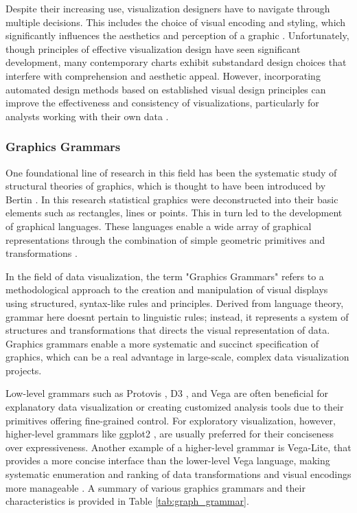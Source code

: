 Despite their increasing use, visualization designers have to navigate
through multiple decisions. This includes the choice of visual encoding
and styling, which significantly influences the aesthetics and
perception of a graphic
\cite{7}. Unfortunately,
though principles of effective visualization design have seen
significant development, many contemporary charts exhibit substandard
design choices that interfere with comprehension and aesthetic appeal.
However, incorporating automated design methods based on established
visual design principles can improve the effectiveness and consistency
of visualizations, particularly for analysts working with their own data
\cite{8}.

\subsubsection{{Graphics Grammars }}\label{graphics-grammars}

One foundational line of research in this field has been the systematic
study of structural theories of graphics, which is thought to have been
introduced by Bertin \cite{9}. In this research statistical graphics were deconstructed into their basic elements such as rectangles, lines or points. This in turn led to the development of
graphical languages. These languages enable a wide array of graphical
representations through the combination of simple geometric primitives
and transformations \cite{5}.

In the field of data visualization, the term "Graphics Grammars" refers
to a methodological approach to the creation and manipulation of visual
displays using structured, syntax-like rules and principles. Derived
from language theory, grammar here doesn\textquotesingle t pertain to
linguistic rules; instead, it represents a system of structures and
transformations that directs the visual representation of data. Graphics
grammars enable a more systematic and succinct specification of
graphics, which can be a real advantage in large-scale, complex data
visualization projects.

Low-level grammars such as Protovis \cite{10}, D3 \cite{11}, and Vega \cite{12} are often beneficial for explanatory data visualization or creating customized analysis tools due to their primitives offering fine-grained control.
For exploratory visualization, however, higher-level grammars like
ggplot2 \cite{13}, are
usually preferred for their conciseness over expressiveness. Another
example of a higher-level grammar is Vega-Lite, that provides a more
concise interface than the lower-level Vega language, making systematic
enumeration and ranking of data transformations and visual encodings
more manageable \cite{14}. A
summary of various graphics grammars and their characteristics is
provided in Table \ref{tab:graph_grammar}.

